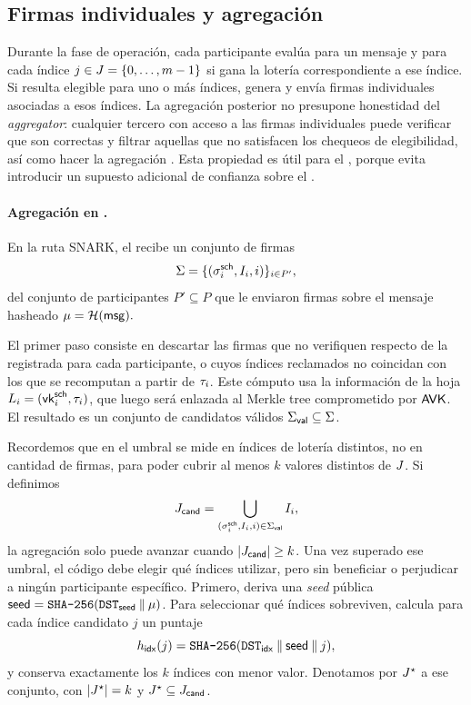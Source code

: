\subsection{Firmas individuales y agregación}
\label{subsec:protocolo-stm-y-esquemas-de-firma-firmas-individuales-y-agregacion}

Durante la fase de operación, cada participante evalúa para un mensaje \ProtocolMsg y para cada índice $j \in J=\{0,\ldots,m-1\}$ si gana la lotería correspondiente a ese índice. Si resulta elegible para uno o más índices, genera y envía firmas individuales asociadas a esos índices. La agregación posterior no presupone honestidad del \textit{aggregator}: cualquier tercero con acceso a las firmas individuales puede verificar que son correctas y filtrar aquellas que no satisfacen los chequeos de elegibilidad, así como hacer la agregación \cite{MithrilDocsProtocol}. Esta propiedad es útil para el \zkBridge, porque evita introducir un supuesto adicional de confianza sobre el \MithrilAggregator.

\paragraph{Agregación en \Lagrange.}
En la ruta SNARK, el \MithrilAggregator recibe un conjunto de firmas
$$\Sigma = \{(\sigma_i^{\mathsf{sch}}, I_i, i)\}_{i \in P'},$$
del conjunto de participantes $P' \subseteq P$ que le enviaron firmas sobre el mensaje hasheado $\mu = \mathcal{H}(\mathsf{msg}).$

El primer paso consiste en descartar las firmas que no verifiquen respecto de la \SchnorrVK registrada para cada participante, o cuyos índices reclamados no coincidan con los que se recomputan a partir de $\tau_i$. Este cómputo usa la información de la hoja $L_{i} = (\mathsf{vk}^{\mathsf{sch}}_i,\tau_i)$, que luego será enlazada al Merkle tree comprometido por \(\mathsf{AVK}\). El resultado es un conjunto de candidatos válidos $\Sigma_{\mathsf{val}} \subseteq \Sigma$.

Recordemos que en \STM el umbral se mide en índices de lotería distintos, no en cantidad de firmas, para poder cubrir al menos $k$ valores distintos de $J$. Si definimos
$$J_{\mathsf{cand}} = \bigcup_{(\sigma_i^{\mathsf{sch}},I_i,i)\in \Sigma_{\mathsf{val}}} I_i,$$
la agregación solo puede avanzar cuando \(|J_{\mathsf{cand}}| \ge k\). Una vez superado ese umbral, el código debe elegir qué índices utilizar, pero sin beneficiar o perjudicar a ningún participante específico. Primero, deriva una \textit{seed} pública $\mathsf{seed} = \texttt{SHA-256}(\texttt{DST}_{\mathsf{seed}} \mathbin{\|} \mu)$. Para seleccionar qué índices sobreviven, calcula para cada índice candidato $j$ un puntaje
$$h_{\mathsf{idx}}(j) =
\texttt{SHA-256}(\texttt{DST}_{\mathsf{idx}} \mathbin{\|} \mathsf{seed} \mathbin{\|} j),$$
y conserva exactamente los $k$ índices con menor valor. Denotamos por $J^{\star}$ a ese conjunto, con
$|J^{\star}| = k$ y $J^{\star} \subseteq J_{\mathsf{cand}}$.

